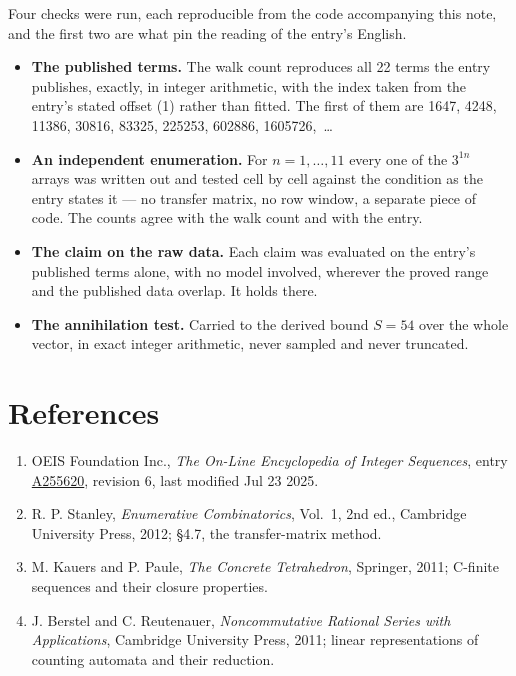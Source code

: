 \documentclass[11pt]{article}
\theoremstyle{definition}
\begin{document}
Four checks were run, each reproducible from the code accompanying this note, and the first two are what pin the reading of the entry's English.

\begin{itemize}

\item {\bfseries The published terms.} The walk count reproduces all 22 terms the entry publishes, exactly, in integer arithmetic, with the index taken from the entry's stated offset (1) rather than fitted. The first of them are 1647, 4248, 11386, 30816, 83325, 225253, 602886, 1605726,~\dots

\item {\bfseries An independent enumeration.} For $n = 1,\dots,11$ every one of the $3^{1n}$ arrays was written out and tested cell by cell against the condition as the entry states it --- no transfer matrix, no row window, a separate piece of code. The counts agree with the walk count and with the entry.

\item {\bfseries The claim on the raw data.} Each claim was evaluated on the entry's published terms alone, with no model involved, wherever the proved range and the published data overlap. It holds there.

\item {\bfseries The annihilation test.} Carried to the derived bound $S = 54$ over the whole vector, in exact integer arithmetic, never sampled and never truncated.

\end{itemize}

\section{References}

\begin{enumerate}

\item OEIS Foundation Inc., \emph{The On-Line Encyclopedia of Integer Sequences}, entry \href{https://oeis.org/A255620}{A255620}, revision 6, last modified Jul 23 2025.

\item R. P. Stanley, \emph{Enumerative Combinatorics}, Vol.~1, 2nd ed., Cambridge University Press, 2012; \S4.7, the transfer-matrix method.

\item M. Kauers and P. Paule, \emph{The Concrete Tetrahedron}, Springer, 2011; C-finite sequences and their closure properties.

\item J. Berstel and C. Reutenauer, \emph{Noncommutative Rational Series with Applications}, Cambridge University Press, 2011; linear representations of counting automata and their reduction.

\end{enumerate}
\end{document}
